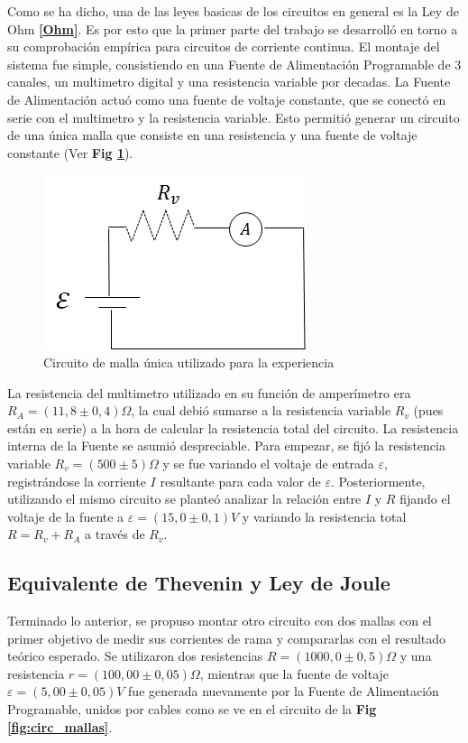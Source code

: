 \documentclass[11pt,a4paper]{article}
\begin{document}
Como se ha dicho, una de las leyes basicas de los circuitos en general es la Ley de Ohm \textbf{\eqref{Ohm}}. Es por esto que la primer parte del trabajo se desarrolló en torno a su comprobación empírica para circuitos de corriente continua. El montaje del sistema fue simple, consistiendo en una Fuente de Alimentación Programable de 3 canales, un multimetro digital y una resistencia variable por decadas. La Fuente de Alimentación actuó como una fuente de voltaje constante, que se conectó en serie con el multimetro y la resistencia variable. Esto permitió generar un circuito de una única malla que consiste en una resistencia y una fuente de voltaje constante (Ver \textbf{Fig \ref{fig:circ_simp}}).


\begin{figure}[h]
  \centering
  \includegraphics[scale= 0.6]{Circuito_simple}
  \caption{Circuito de malla única utilizado para la experiencia}
  \label{fig:circ_simp}
\end{figure}

La resistencia del multimetro utilizado en su función de amperímetro era $R_{A} = (11,8 \pm 0,4) \Omega$, la cual debió sumarse a la resistencia variable $R_v$ (pues están en serie) a la hora de calcular la resistencia total del circuito. La resistencia interna de la Fuente se asumió despreciable. Para empezar, se fijó la resistencia variable $R_v = (500 \pm 5)\Omega$ y se fue variando el voltaje de entrada $\varepsilon$, registrándose la corriente $I$ resultante para cada valor de $\varepsilon$. Posteriormente, utilizando el mismo circuito se planteó analizar la relación entre $I$ y $R$ fijando el voltaje de la fuente a $\varepsilon = (15,0 \pm 0,1)V$ y variando la resistencia total $R = R_v + R_A$ a través de $R_v$. 


\subsection{Equivalente de Thevenin y Ley de Joule}

Terminado lo anterior, se propuso montar otro circuito con dos mallas con el primer objetivo de medir sus corrientes de rama y compararlas con el resultado teórico esperado. Se utilizaron dos resistencias $R = (1000,0\pm0,5)\Omega$ y una resistencia $r = (100,00\pm0,05)\Omega$, mientras que la fuente de voltaje $\varepsilon = (5,00\pm0,05)V$ fue generada nuevamente por la Fuente de Alimentación Programable, unidos por cables como se ve en el circuito de la \textbf{Fig \ref{fig:circ_mallas}}.
\end{document}

